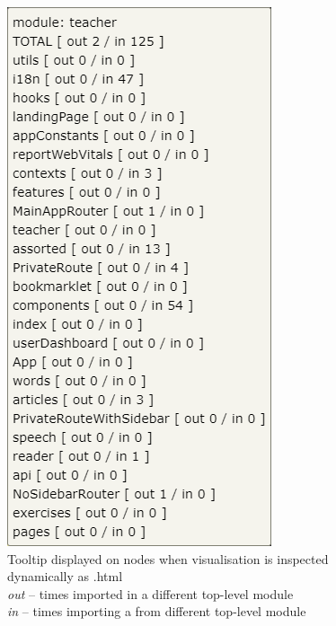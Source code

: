 \documentclass{article}
\begin{document}
\begin{figure}[h]
\centering
\includegraphics[]{graphics/node_tooltip.png}
\caption{Tooltip displayed on nodes when visualisation is inspected dynamically as .html\\
\hspace*{2em}\textit{out} -- times imported in a different top-level module \\
\hspace*{2em}\textit{in} -- times importing a from different top-level module}
\label{fig:d:nodetooltip}
\end{figure}
\end{document}
